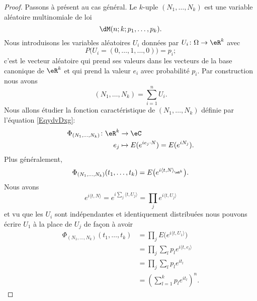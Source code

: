 \begin{proof}
    Passons à présent au cas général. Le \( k\)-uple \( (N_1,\ldots, N_k)\) est une variable aléatoire multinomiale de loi
    \begin{equation}
        \dM(n;k;p_1,\ldots, p_k).
    \end{equation}
    Nous introduisons les variables aléatoires \( U_i\) données par \( U_i\colon \Omega\to \eR^k\) avec
    \begin{equation}
        P\big( U_i=(0,\ldots, 1,\ldots, 0) \big)=p_i;
    \end{equation}
    c'est le vecteur aléatoire qui prend ses valeurs dans les vecteurs de la base canonique de \( \eR^k\) et qui prend la valeur \( e_i\) avec probabilité \( p_i\). Par construction nous avons
    \begin{equation}
        (N_1,\ldots, N_k)=\sum_{i=1}^nU_i.
    \end{equation}
    Nous allons étudier la fonction caractéristique de \( (N_1,\ldots, N_k)\) définie par l'équation \eqref{EqydvDxg}:
    \begin{equation}
        \begin{aligned}
            \Phi_{(N_1,\ldots, N_k)}\colon\eR^k &\to \eC \\
            e_j&\mapsto E( e^{ie_j\cdot N})=E( e^{iN_j}). 
        \end{aligned}
    \end{equation}
    Plus généralement,
    \begin{equation}
        \Phi_{(N_1,\ldots, N_k)}(t_1,\ldots, t_k)=E\big(  e^{i\langle t, N\rangle_{\eR^k} } \big).
    \end{equation}
    Nous avons
    \begin{equation}
        e^{i\langle t, N\rangle }= e^{i\sum_j\langle t, U_j\rangle }=\prod_j e^{i\langle t, U_j\rangle }
    \end{equation}
    et vu que les \( U_i\) sont indépendantes et identiquement distribuées nous pouvons écrire \( U_1\) à la place de \( U_j\) de façon à avoir
    \begin{subequations}    \label{EqOhTHia}
        \begin{align}
            \Phi_{(N_1,\ldots, N_k)}(t_1,\ldots, t_k)&=\prod_{j}E\big(  e^{i\langle t, U_1\rangle } \big)\\
            &=\prod_j\sum_lp_l e^{i\langle t, e_l\rangle }\\
            &=\prod_j\sum_lp_l e^{it_l}\\
            &=\left( \sum_{l=1}^kp_l e^{it_l} \right)^n.
        \end{align}

\end{subequations}
\end{proof}
